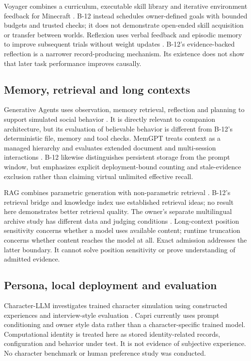 \documentclass[11pt]{article}
\begin{document}
Voyager combines a curriculum, executable skill library and iterative environment feedback for Minecraft \cite{voyager}. B-12 instead schedules owner-defined goals with bounded budgets and trusted checks; it does not demonstrate open-ended skill acquisition or transfer between worlds. Reflexion uses verbal feedback and episodic memory to improve subsequent trials without weight updates \cite{reflexion}. B-12's evidence-backed reflection is a narrower record-producing mechanism. Its existence does not show that later task performance improves causally.

\subsection{Memory, retrieval and long contexts}
Generative Agents uses observation, memory retrieval, reflection and planning to support simulated social behavior \cite{generative}. It is directly relevant to companion architecture, but its evaluation of believable behavior is different from B-12's deterministic file, memory and tool checks. MemGPT treats context as a managed hierarchy and evaluates extended document and multi-session interactions \cite{memgpt}. B-12 likewise distinguishes persistent storage from the prompt window, but emphasizes explicit deployment-bound counting and stale-evidence exclusion rather than claiming virtual unlimited effective recall.

RAG combines parametric generation with non-parametric retrieval \cite{rag}. B-12's retrieval bridge and knowledge index use established retrieval ideas; no result here demonstrates better retrieval quality. The owner's separate multilingual archive study has different data and judging conditions \cite{archive}. Long-context position sensitivity \cite{lost} concerns whether a model uses available content; runtime truncation concerns whether content reaches the model at all. Exact admission addresses the latter boundary. It cannot solve position sensitivity or prove understanding of admitted evidence.

\subsection{Persona, local deployment and evaluation}
Character-LLM investigates trained character simulation using constructed experiences and interview-style evaluation \cite{character}. Capri currently uses prompt conditioning and owner style data rather than a character-specific trained model. Computational identity is treated here as stored identity-related records, configuration and behavior under test. It is not evidence of subjective experience. No character benchmark or human preference study was conducted.
\end{document}
